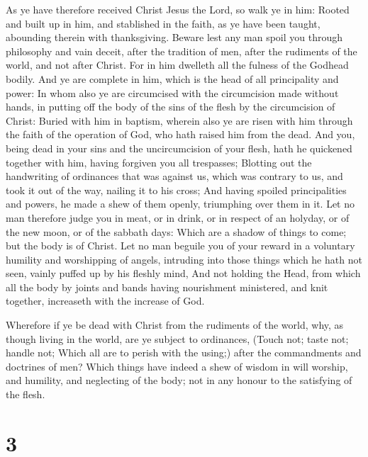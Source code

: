  As ye have therefore received Christ Jesus the Lord, so
walk ye in him:  Rooted and built up in him, and
stablished in the faith, as ye have been taught, abounding therein with
thanksgiving.  Beware lest any man spoil you through
philosophy and vain deceit, after the tradition of men, after the
rudiments of the world, and not after Christ.  For in him
dwelleth all the fulness of the Godhead bodily.  And ye
are complete in him, which is the head of all principality and power:
 In whom also ye are circumcised with the circumcision
made without hands, in putting off the body of the sins of the flesh by
the circumcision of Christ:  Buried with him in baptism,
wherein also ye are risen with him through the faith of the operation of
God, who hath raised him from the dead.  And you, being
dead in your sins and the uncircumcision of your flesh, hath he
quickened together with him, having forgiven you all trespasses;
 Blotting out the handwriting of ordinances that was
against us, which was contrary to us, and took it out of the way,
nailing it to his cross;  And having spoiled
principalities and powers, he made a shew of them openly, triumphing
over them in it.  Let no man therefore judge you in meat,
or in drink, or in respect of an holyday, or of the new moon, or of the
sabbath days:  Which are a shadow of things to come; but
the body is of Christ.  Let no man beguile you of your
reward in a voluntary humility and worshipping of angels, intruding into
those things which he hath not seen, vainly puffed up by his fleshly
mind,  And not holding the Head, from which all the body
by joints and bands having nourishment ministered, and knit together,
increaseth with the increase of God.

 Wherefore if ye be dead with Christ from the rudiments
of the world, why, as though living in the world, are ye subject to
ordinances,  (Touch not; taste not; handle not;
 Which all are to perish with the using;) after the
commandments and doctrines of men?  Which things have
indeed a shew of wisdom in will worship, and humility, and neglecting of
the body; not in any honour to the satisfying of the flesh.

\hypertarget{section-2}{%
\section{3}\label{section-2}}

